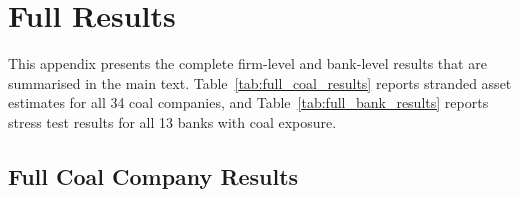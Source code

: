 
\section{Full Results}
\label{sec:appendix_results}

This appendix presents the complete firm-level and bank-level results that are summarised in the main text. Table~\ref{tab:full_coal_results} reports stranded asset estimates for all 34 coal companies, and Table~\ref{tab:full_bank_results} reports stress test results for all 13 banks with coal exposure.


\subsection{Full Coal Company Results}
\label{subsec:full_coal}

